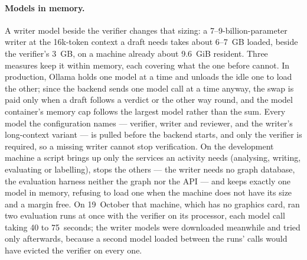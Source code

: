 \paragraph{Models in memory.} A writer model beside the verifier changes
that sizing: a 7--9-billion-parameter writer at the 16k-token context a
draft needs takes about 6--7~GB loaded, beside the verifier's 3~GB, on a
machine already about 9.6~GiB resident. Three measures keep it within
memory, each covering what the one before cannot. In production, Ollama
holds one model at a time and unloads the idle one to load the other;
since the backend sends one model call at a time anyway, the swap is
paid only when a draft follows a verdict or the other way round, and the
model container's memory cap follows the largest model rather than the
sum. Every model the configuration names --- verifier, writer and
reviewer, and the writer's long-context variant --- is pulled before the
backend starts, and only the verifier is required, so a missing writer
cannot stop verification. On the development machine a script brings up
only the services an activity needs (analysing, writing, evaluating or
labelling), stops the others --- the writer needs no graph database,
the evaluation harness neither the graph nor the API --- and keeps
exactly one model in memory, refusing to load one when the machine does
not have its size and a margin free. On 19~October that machine, which
has no graphics card, ran two evaluation runs at once with the verifier
on its processor, each model call taking 40 to 75~seconds; the writer
models were downloaded meanwhile and tried only afterwards, because a
second model loaded between the runs' calls would have evicted the
verifier on every one.
